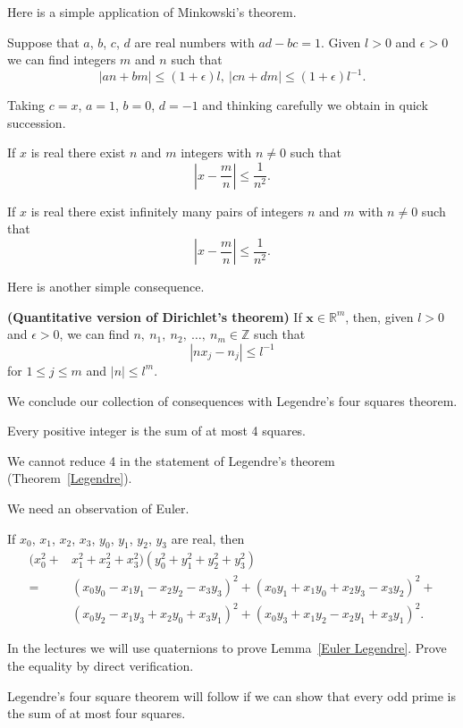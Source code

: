 Here is a simple application of Minkowski's theorem.
\begin{lemma} Suppose that $a$, $b$, $c$, $d$ are
real numbers with $ad-bc=1$. Given $l>0$ and $\epsilon>0$
we can find integers $m$ and $n$ such that
\[|an+bm|\leq(1+\epsilon) l,\ |cn+dm|\leq (1+\epsilon) l^{-1}.\]
\end{lemma}
Taking $c=x$, $a=1$, $b=0$, $d=-1$ and thinking carefully
we obtain in quick succession.
\begin{lemma} If $x$ is real there exist $n$ and $m$ integers
with $n\neq 0$ such that
\[\left|x-\frac{m}{n}\right|\leq\frac{1}{n^{2}}.\]
\end{lemma}
\begin{lemma} If $x$ is real there exist infinitely
many pairs of integers $n$ and $m$
with $n\neq 0$ such that
\[\left|x-\frac{m}{n}\right|\leq\frac{1}{n^{2}}.\]
\end{lemma}

Here is another simple consequence.
\begin{lemma}{\bf (Quantitative version of Dirichlet's theorem)}
If ${\mathbf x}\in{\mathbb R}^{m}$, then,
given $l>0$ and $\epsilon>0$,
we can find
$n,\ n_{1},\ n_{2},\ \dots,\ n_{m}\in{\mathbb Z}$ such that
\[|nx_{j}-n_{j}|\leq l^{-1}\]
for $1\leq j\leq m$ and $|n|\leq l^{m}$.
\end{lemma}

We conclude our collection of consequences with
Legendre's four squares theorem.
\begin{theorem}[Legendre]\label{Legendre}
Every positive integer
is the sum of at most 4 squares.
\end{theorem}
\begin{lemma} We cannot reduce 4 in the statement
of Legendre's theorem (Theorem~\ref{Legendre}).
\end{lemma}

We need an observation of Euler.
\begin{lemma}\label{Euler Legendre} If $x_{0}$, $x_{1}$,
$x_{2}$, $x_{3}$, $y_{0}$, $y_{1}$,
$y_{2}$, $y_{3}$ are real, then
\begin{align*}
(x_{0}^{2}+&x_{1}^{2}+x_{2}^{2}+x_{3}^{2})
(y_{0}^{2}+y_{1}^{2}+y_{2}^{2}+y_{3}^{2})\\
=&(x_{0}y_{0}-x_{1}y_{1}-x_{2}y_{2}-x_{3}y_{3})^{2}+
(x_{0}y_{1}+x_{1}y_{0}+x_{2}y_{3}-x_{3}y_{2})^{2}+\\
&(x_{0}y_{2}-x_{1}y_{3}+x_{2}y_{0}+x_{3}y_{1})^{2}+
(x_{0}y_{3}+x_{1}y_{2}-x_{2}y_{1}+x_{3}y_{1})^{2}.
\end{align*}
\end{lemma}
\begin{exercise} In the lectures we will use quaternions
to prove Lemma~\ref{Euler Legendre}. Prove the
equality by direct verification.
\end{exercise}
\begin{lemma} Legendre's four square theorem will follow
if we can show that every odd prime is the sum
of at most four squares.
\end{lemma}

